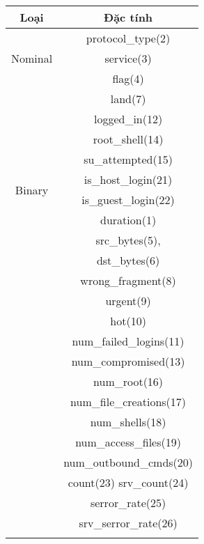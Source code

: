 \begin{table}[!h]
	\begin{center}
		\begin{tabular}{ | c | c | }
			\hline
			\textbf{Loại}               & \textbf{Đặc tính} \\
			\hline
			\multirow{3}{2cm}{Nominal}  & protocol\_type(2) \\ &
			service(3)                                      \\ &
			flag(4)                                         \\
			\hline
			\multirow{10}{2cm}{Binary}  & land(7)           \\ &
			logged\_in(12)                                  \\ &
			root\_shell(14)                                 \\ &
			su\_attempted(15)                               \\ &
			is\_host\_login(21)                             \\ &
			is\_guest\_login(22)                            \\
			\hline
			\multirow{22}{2cm}{Numeric} & duration(1)       \\ &
			src\_bytes(5),                                  \\ &
			dst\_bytes(6)                                   \\ &
			wrong\_fragment(8)                              \\ &
			urgent(9)                                       \\ & hot(10) \\ &
			num\_failed\_logins(11)                         \\ &
			num\_compromised(13)                            \\ &
			num\_root(16)                                   \\ &
			num\_file\_creations(17)                        \\ &
			num\_shells(18)                                 \\ &
			num\_access\_files(19)                          \\ &
			num\_outbound\_cmds(20)                         \\ &
			count(23)
			srv\_count(24)                                  \\ &
			serror\_rate(25)                                \\ &
			srv\_serror\_rate(26)                           \\ &

\end{tabular}
\end{center}
\end{table}

